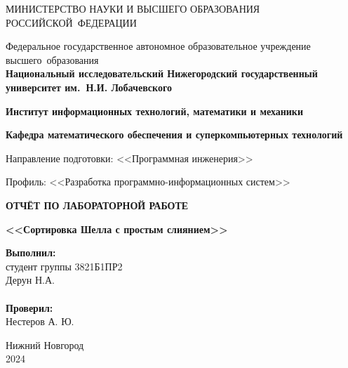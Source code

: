 \documentclass[]{article}
\theoremstyle{remark}
\theoremstyle{definition}
\begin{document}
\begin{titlepage}

\begin{center}
\MakeUppercase{Министерство науки и высшего образования Российской~Федерации}
\end{center}

\begin{center}
Федеральное государственное автономное образовательное учреждение высшего~образования \\
\textbf{Национальный исследовательский Нижегородский государственный университет им.~Н.И. Лобачевского}
\end{center}

\begin{center}
\textbf{Институт информационных технологий, математики и механики}
\end{center}
\begin{center}
\textbf{Кафедра математического обеспечения и суперкомпьютерных технологий}
\end{center}
\begin{center}
Направление подготовки: <<Программная инженерия>>
\end{center}
\begin{center}
Профиль: <<Разработка программно-информационных систем>>
\end{center}

\vspace{3em}

\begin{center}
\textbf{\Large\MakeUppercase{Отчёт по лабораторной работе}} \\
\end{center}
\begin{center}
\textbf{\Large<<Сортировка Шелла с простым слиянием>>} \\
\end{center}

\vspace{5em}

\newbox{\lbox}
\newlength{\maxl}
\setlength{\maxl}{\wd\lbox}
\hfill\parbox{7cm}{
\hspace*{5cm}\hspace*{-5cm}\textbf{Выполнил:} \\ студент группы 	3821Б1ПР2 \\ Дерун Н.А.\\
\\

\hspace*{5cm}\hspace*{-5cm}\textbf{Проверил:} \\ Нестеров А. Ю.
}
\vspace{\fill}

\begin{center} Нижний Новгород \\ 2024 \end{center}

\end{titlepage}
\end{document}
